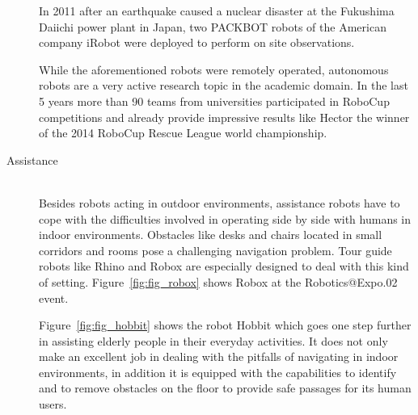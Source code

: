 \begin{description}
In 2011 after an earthquake caused a nuclear disaster at the Fukushima Daiichi power plant in Japan, two PACKBOT robots of the American company iRobot were deployed to perform on site observations.

While the aforementioned robots were remotely operated, autonomous robots are a very active research topic in the academic domain. In the last 5 years more than 90 teams from universities participated in RoboCup competitions and already provide impressive results like Hector \cite{2014:hector_rescue_tdp} the winner of the 2014 RoboCup Rescue League world championship.

\item[Assistance]\hfill \\
Besides robots acting in outdoor environments, assistance robots have to cope with the difficulties involved in operating side by side with humans in indoor environments. 
Obstacles like desks and chairs located in small corridors and rooms pose a challenging navigation problem.
Tour guide robots like Rhino \cite{DWA1997} and Robox \cite{philippsen:2004:phd} are especially designed to deal with this kind of setting.
Figure~\ref{fig:fig_robox} shows Robox at the Robotics@Expo.02 event. 

Figure~\ref{fig:fig_hobbit} shows the robot Hobbit \cite{fischinger2013hobbit}\cite{zagler2014roboter} which goes one step further in assisting elderly people in their everyday activities.
It does not only make an excellent job in dealing with the pitfalls of navigating in indoor environments, in addition it is equipped with the capabilities to identify and to remove obstacles on the floor to provide safe passages for its human users.


\end{description}
